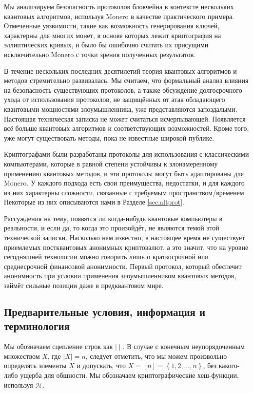 \documentclass{mrl}
\begin{document}
Мы анализируем безопасность протоколов блокчейна в контексте нескольких квантовых алгоритмов, используя Monero в качестве практического примера. Отмеченные уязвимости, такие как возможность генерирования ключей, характерны для многих монет, в основе которых лежит криптография на эллиптических кривых, и было бы ошибочно считать их присущими исключительно Monero с точки зрения полученных результатов.

В течение нескольких последних десятилетий теория квантовых алгоритмов и методов стремительно развивалась. Мы считаем, что формальный анализ влияния на безопасность существующих протоколов, а также обсуждение долгосрочного ухода от использования протоколов, не защищённых от атак обладающего квантовыми мощностями злоумышленника, уже представляются запоздалыми. Настоящая техническая записка не может считаться исчерпывающей. Появляется всё больше квантовых алгоритмов и соответствующих возможностей. Кроме того, уже могут существовать методы, пока не известные широкой публике.

Криптографами были разработаны протоколы для использования с классическими компьютерами, которые в равной степени устойчивы к злонамеренному применению квантовых методов, и эти протоколы могут быть адаптированы для Monero. У каждого подхода есть свои преимущества, недостатки, и для каждого из них характерны сложности, связанные с требуемым пространством/временем. Некоторые из них описываются нами в Разделе \ref{sec:altprot}. 

Рассуждения на тему, появятся ли когда-нибудь квантовые компьютеры в реальности, и если да, то когда это произойдёт, не являются темой этой технической записки. Насколько нам известно, в настоящее время не существует приемлемых постквантовых анонимных криптовалют, а это значит, что на уровне сегодняшней технологии можно говорить лишь о краткосрочной или среднесрочной финансовой анонимности. Первый протокол, который обеспечит анонимность при условии применения злоумышленником квантовых методов, займёт сильные позиции даже в предквантовом мире.

\subsection{Предварительные условия, информация и терминология}

Мы обозначаем сцепление строк как $\mid \mid$. В случае с конечным неупорядоченным множеством $X$, где $\left|X\right| = n$, следует отметить, что мы можем произвольно определять элементы $X$ и допускать, что $X = \left[n\right] = \left\{1, 2, \ldots, n\right\}$, без какого-либо ущерба для общности. Мы обозначаем криптографические хеш-функции, используя $\mathcal{H}$.
\end{document}
